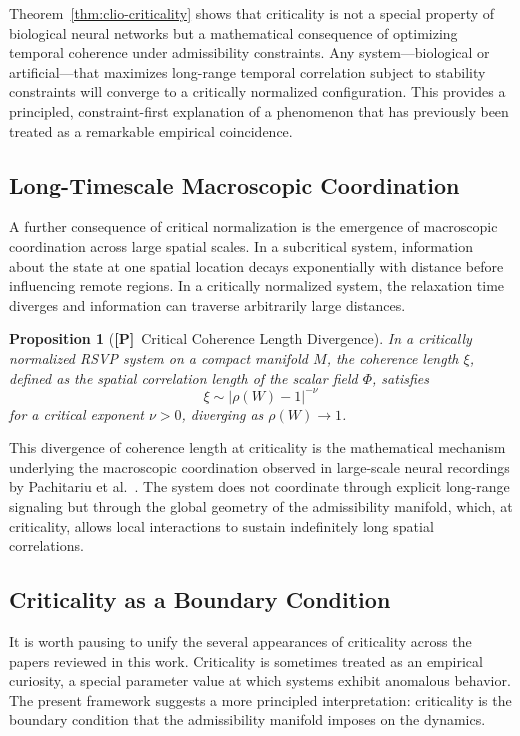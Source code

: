 \documentclass[11pt, oneside]{article}
\numberwithin{equation}{section}
\newcommand{\ClaimP}{\textcolor{rsvpgray!70}{\textbf{[P]}}}
\theoremstyle{rsvpstyle}
\newtheorem{proposition}[theorem]{Proposition}
\theoremstyle{remark}
\begin{document}
Theorem~\ref{thm:clio-criticality} shows that criticality is not a special property of
biological neural networks but a mathematical consequence of optimizing temporal
coherence under admissibility constraints. Any system---biological or artificial---that
maximizes long-range temporal correlation subject to stability constraints will converge
to a critically normalized configuration. This provides a principled, constraint-first
explanation of a phenomenon that has previously been treated as a remarkable empirical
coincidence.

\subsection{Long-Timescale Macroscopic Coordination}

A further consequence of critical normalization is the emergence of macroscopic
coordination across large spatial scales. In a subcritical system, information about the
state at one spatial location decays exponentially with distance before influencing
remote regions. In a critically normalized system, the relaxation time diverges and
information can traverse arbitrarily large distances.

\begin{proposition}[\ClaimP\ Critical Coherence Length Divergence]
In a critically normalized RSVP system on a compact manifold $M$, the coherence length
$\xi$, defined as the spatial correlation length of the scalar field $\Phi$, satisfies
\begin{equation}
  \xi \sim |\rho(W) - 1|^{-\nu}
\end{equation}
for a critical exponent $\nu > 0$, diverging as $\rho(W) \to 1$.
\end{proposition}

This divergence of coherence length at criticality is the mathematical mechanism
underlying the macroscopic coordination observed in large-scale neural recordings
by Pachitariu et al.~\cite{Pachitariu2026Critical}. The system does not coordinate
through explicit long-range signaling but through the global geometry of the
admissibility manifold, which, at criticality, allows local interactions to sustain
indefinitely long spatial correlations.

\subsection{Criticality as a Boundary Condition}

It is worth pausing to unify the several appearances of criticality across the papers
reviewed in this work. Criticality is sometimes treated as an empirical curiosity, a
special parameter value at which systems exhibit anomalous behavior. The present
framework suggests a more principled interpretation: criticality is the boundary
condition that the admissibility manifold imposes on the dynamics.
\end{document}

